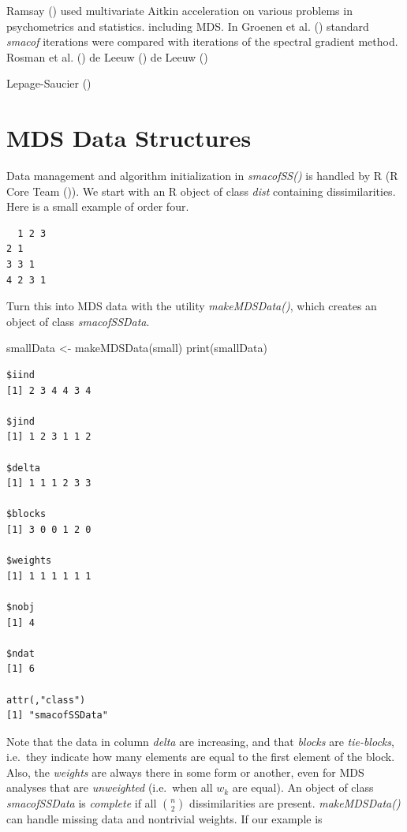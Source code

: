 \documentclass[
  12pt,
  letterpaper,
  DIV=11,
  numbers=noendperiod]{scrartcl}
\newenvironment{Shaded}{\begin{snugshade}}{\end{snugshade}}
\newcommand{\FunctionTok}[1]{\textcolor[rgb]{0.28,0.35,0.67}{#1}}
\newcommand{\NormalTok}[1]{\textcolor[rgb]{0.00,0.23,0.31}{#1}}
\newcommand{\OtherTok}[1]{\textcolor[rgb]{0.00,0.23,0.31}{#1}}
\begin{document}
Ramsay () used multivariate Aitkin
acceleration on various problems in psychometrics and statistics.
including MDS. In Groenen et al.
() standard \emph{smacof}
iterations were compared with iterations of the spectral gradient
method. Rosman et al.
() {de
Leeuw} () {de Leeuw}
()

Lepage-Saucier ()

\section{MDS Data Structures}\label{mds-data-structures}

Data management and algorithm initialization in \emph{smacofSS()} is
handled by R (R Core Team ()). We
start with an R object of class \emph{dist} containing dissimilarities.
Here is a small example of order four.

\begin{verbatim}
  1 2 3
2 1    
3 3 1  
4 2 3 1
\end{verbatim}

Turn this into MDS data with the utility \emph{makeMDSData()}, which
creates an object of class \emph{smacofSSData}.

\begin{Shaded}
\begin{Highlighting}[]
\NormalTok{smallData }\OtherTok{\textless{}{-}} \FunctionTok{makeMDSData}\NormalTok{(small)}
\FunctionTok{print}\NormalTok{(smallData)}
\end{Highlighting}
\end{Shaded}

\begin{verbatim}
$iind
[1] 2 3 4 4 3 4

$jind
[1] 1 2 3 1 1 2

$delta
[1] 1 1 1 2 3 3

$blocks
[1] 3 0 0 1 2 0

$weights
[1] 1 1 1 1 1 1

$nobj
[1] 4

$ndat
[1] 6

attr(,"class")
[1] "smacofSSData"
\end{verbatim}

Note that the data in column \emph{delta} are increasing, and that
\emph{blocks} are \emph{tie-blocks}, i.e.~they indicate how many
elements are equal to the first element of the block. Also, the
\emph{weights} are always there in some form or another, even for MDS
analyses that are \emph{unweighted} (i.e.~when all \(w_k\) are equal).
An object of class \emph{smacofSSData} is \emph{complete} if all
\(\binom{n}{2}\) dissimilarities are present. \emph{makeMDSData()} can
handle missing data and nontrivial weights. If our example is
\end{document}
